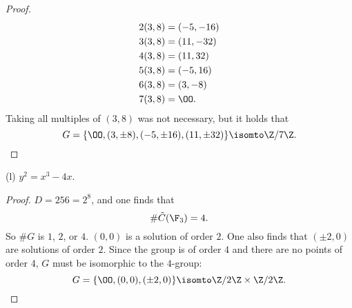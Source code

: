 \documentclass[11pt, oneside]{article}
\begin{document}
\begin{enumerate}
\begin{proof}
\begin{align*}
2(3,8) &= (-5, -16)\\
3(3,8) &= (11, -32)\\
4(3,8) & = (11, 32)\\
5(3,8) &= (-5,16)\\
6(3,8) &= (3, -8)\\
7(3,8) &= \OO.
\end{align*}
Taking all multiples of $(3,8)$ was not necessary, but it holds that
$$
G=\{ \OO, (3,\pm 8), (-5,\pm 16), (11,\pm 32)\} \isomto \Z/7\Z.
$$
\end{proof}
(l) $y^2 = x^3 - 4x$.
\begin{proof}
$D =  256  = 2^8$, and one finds that 
$$
\# \tilde C(\F_3) = 4.
$$
So $\# G$ is $1$, $2$, or $4$. $(0,0)$ is a solution of order $2$. One also finds that $(\pm2, 0)$ are solutions of order $2$. Since the group is of order $4$ and there are no points of order $4$, $G$ must be isomorphic to the $4$-group:
$$
G = \{ \OO, (0,0), (\pm 2, 0)\}\isomto \Z/2\Z \times \Z/2\Z.
$$
\end{proof}
\end{enumerate}
\end{document}
